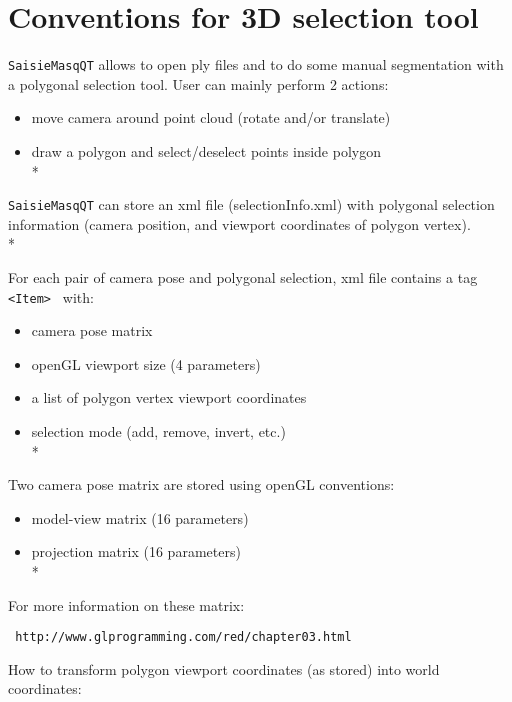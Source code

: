 

\section{Conventions for 3D selection tool}
\label{Conv:selection}

{\tt SaisieMasqQT} allows to open ply files and to do some manual segmentation with a polygonal selection tool.
User can mainly perform 2 actions:
\begin{itemize}
\item move camera around point cloud (rotate and/or translate)
\item draw a polygon and select/deselect points inside polygon\\*
\end{itemize}

{\tt SaisieMasqQT} can store an xml file (selectionInfo.xml) with polygonal selection information (camera position, and viewport coordinates of polygon vertex).\\*

For each pair of camera pose and polygonal selection, xml file contains a tag {\tt <Item> } with:
\begin{itemize}
\item camera pose matrix
\item openGL viewport size (4 parameters)
\item a list of polygon vertex viewport coordinates
\item selection mode (add, remove, invert, etc.)\\*
\end{itemize}

Two camera pose matrix are stored using openGL conventions:

\begin{itemize}
\item model-view matrix (16 parameters)
\item projection matrix (16 parameters)\\*
\end{itemize}

For more information on these matrix:

\begin{verbatim} http://www.glprogramming.com/red/chapter03.html \end{verbatim}

How to transform polygon viewport coordinates (as stored) into world coordinates:


